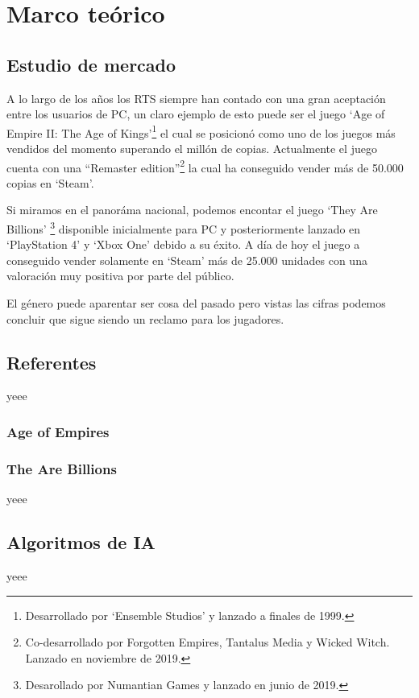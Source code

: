 \chapter{Marco teórico}
\label{Marco_teorico}

\section{Estudio de mercado}
A lo largo de los años los \ac{RTS} siempre han contado con una gran aceptación entre
los usuarios de \ac{PC}, un claro ejemplo de esto puede ser el juego `Age of Empire
II: The Age of Kings'\footnote{Desarrollado por `Ensemble Studios' y lanzado a
finales de 1999.} el cual se posicionó como uno de los juegos más vendidos del momento
superando el millón de copias. Actualmente el juego cuenta con una ``Remaster
edition''\footnote{Co-desarrollado por Forgotten Empires, Tantalus Media y Wicked
Witch. Lanzado en noviembre de 2019.} la cual ha conseguido vender más de 50.000
copias en `Steam'.

Si miramos en el panoráma nacional, podemos encontar el juego `They Are Billions'
\footnote{Desarollado por Numantian Games y lanzado en junio de 2019.} disponible
inicialmente para \ac{PC} y posteriormente lanzado en `PlayStation 4' y `Xbox One'
debido a su éxito. A día de hoy el juego a conseguido vender solamente en `Steam'
más de 25.000 unidades con una valoración muy positiva por parte del público.

El género puede aparentar ser cosa del pasado pero vistas las cifras podemos concluir
que sigue siendo un reclamo para los jugadores.

\section{Referentes}
yeee

\subsection{Age of Empires}
  

\subsection{The Are Billions}
yeee

\section{Algoritmos de IA}
yeee

